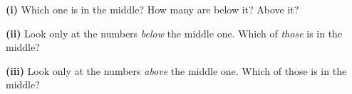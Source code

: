 \documentclass[12pt]{article}
\begin{document}
\begin{enumerate}[leftmargin=1.9em, itemsep=0.40in]
        \textbf{(i)} Which one is in the middle? \blank{2.0cm} \quad
        How many are below it? \blank{1.4cm} \quad Above it? \blank{1.4cm}
        \vspace{12pt}

        \textbf{(ii)} Look only at the numbers \emph{below} the middle one. Which of
        \emph{those} is in the middle? \blank{2.0cm}
        \vspace{12pt}

        \textbf{(iii)} Look only at the numbers \emph{above} the middle one. Which of those
        is in the middle? \blank{2.0cm}

\end{enumerate}
\end{document}

